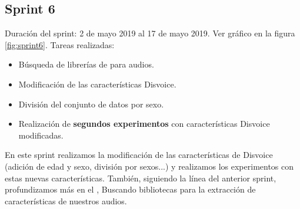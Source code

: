 \subsection{Sprint 6}
Duración del sprint: 2 de mayo 2019 al 17 de mayo 2019. Ver gráfico  en la figura \ref{fig:sprint6}.
Tareas realizadas:
\begin{itemize}
\item Búsqueda de librerías de  para audios.
\item Modificación de las características Disvoice.
\item División del conjunto de datos por sexo.
\item Realización de \textbf{segundos experimentos} con características Disvoice modificadas.
\end{itemize}
En este sprint realizamos la modificación de las características de Disvoice (adición de edad y sexo, división por sexos...) y realizamos los experimentos con estas nuevas características. También, siguiendo la línea del anterior sprint, profundizamos más en el , Buscando bibliotecas para la extracción de características de nuestros audios.

